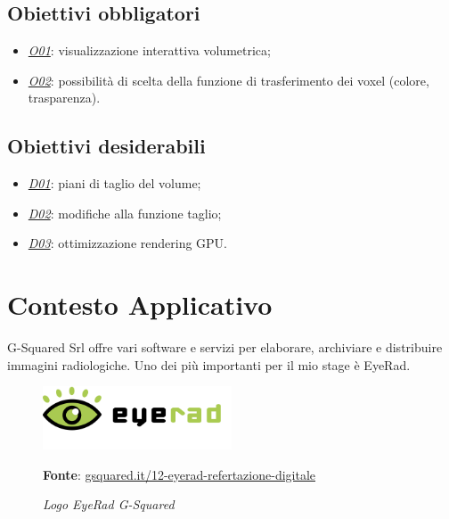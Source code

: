 \subsection{Obiettivi obbligatori}\label{sec:obiettivi-obbligatori}
\begin{itemize}
\item \underline{\textit{O01}}: visualizzazione interattiva volumetrica;
\item \underline{\textit{O02}}: possibilità di scelta della funzione di trasferimento dei voxel (colore, trasparenza).
\end{itemize}

\subsection{Obiettivi desiderabili}\label{sec:obiettivi-desiderabili}
\begin{itemize}
\item \underline{\textit{D01}}: piani di taglio del volume;
\item \underline{\textit{D02}}: modifiche alla funzione taglio;
\item \underline{\textit{D03}}: ottimizzazione rendering GPU.
\end{itemize}

\section{Contesto Applicativo}
G-Squared Srl offre vari software e servizi per elaborare, archiviare e distribuire immagini radiologiche. Uno dei più importanti per il mio stage è EyeRad.

\begin{figure}[h]
    \centering
    \includegraphics[width=0.5\textwidth]{immagini/logo-software-eyerad.png}
    \caption{\textit{Logo EyeRad G-Squared}}
    \textbf{Fonte}: \href{https://www.gsquared.it/it/pacs-ris-web-gateway-dicom-ihe-2/software-immagini-medicali/12-eyerad-refertazione-digitale}{gsquared.it/12-eyerad-refertazione-digitale}
    \label{fig: Logo software EyeRad G-Squared}
\end{figure}

